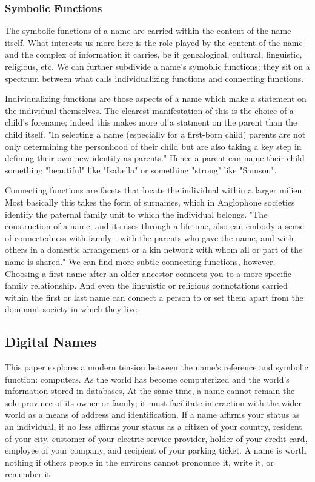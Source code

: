 \subsubsection{Symbolic Functions}

The symbolic functions of a name are carried within the content of the name
itself. What interests us more here is the role played by the content of the
name and the complex of information it carries, be it genealogical, cultural,
linguistic, religious, etc. We can further subdivide a name's symoblic
functions; they sit on a spectrum between what \textcite{finch08} calls
individualizing functions and connecting functions.

Individualizing functions are those aspects of a name which make a statement on
the individual themselves. The clearest manifestation of this is the choice of a
child's forename; indeed this makes more of a statment on the parent than the
child itself. "In selecting a name (especially for a first-born child) parents
are not only determining the personhood of their child but are also taking a key
step in defining their own new identity as parents." \parencite[718]{finch08}
Hence a parent can name their child something "beautiful" like "Isabella" or
something "strong" like "Samson".

Connecting functions are facets that locate the individual within a larger
milieu. Most basically this takes the form of surnames, which in Anglophone
societies identify the paternal family unit to which the individual belongs.
"The construction of a name, and its uses through a lifetime, also can embody a
sense of connectedness with family - with the parents who gave the name, and
with others in a domestic arrangement or a kin network with whom all or part of
the name is shared." \parencite[711]{finch08} We can find more subtle connecting
functions, however. Choosing a first name after an older ancestor connects you
to a more specific family relationship. And even the linguistic or religious
connotations carried within the first or last name can connect a person to or
set them apart from the dominant society in which they live.

\subsection{Digital Names}

This paper explores a modern tension between the name's reference and symbolic
function: computers. As the world has become computerized and the world's
information stored in databases, At the same time, a name cannot remain the sole
province of its owner or family; it must facilitate interaction with the wider
world as a means of address and identification. If a name affirms your status as
an individual, it no less affirms your status as a citizen of your country,
resident of your city, customer of your electric service provider, holder of
your credit card, employee of your company, and recipient of your parking
ticket. A name is worth nothing if others people in the environs cannot
pronounce it, write it, or remember it.

